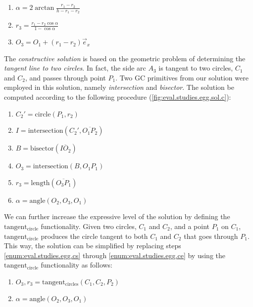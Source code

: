 \begin{enumerate}
  \item $\alpha = 2\arctan\frac{r_1 - r_2}{h - r_1 - r_2}$
  \item $r_3 = \frac{r_1 - r_2 \cos\alpha}{1 - \cos\alpha}$
  \item $O_3 = O_1 + \left(r_1 - r_2\right)\vec{e}_x$
\end{enumerate}

The \textit{constructive solution} is based on the geometric problem of
determining the \textit{tangent line to two circles}.  In fact, the side arc
$A_3$ is tangent to two circles, $C_1$ and $C_2$, and passes through point
$P_1$.  Two \ac{GC} primitives from our solution were employed in this
solution, namely \textit{intersection} and \textit{bisector}.  The solution be
computed according to the following procedure
(\cref{fig:eval.studies.egg.sol.c}):

\begin{enumerate}
  \item $C_{2}' = \mathrm{circle}\left(P_1, r_2\right)$
  \label{enum:eval.studies.egg.cs}
  \item $I = \mathrm{intersection}\left(C_{2}', \overline{O_1 P_2}\right)$
  \item $B = \mathrm{bisector}\left(\overline{IO_2}\right)$
  \item $O_3 = \mathrm{intersection}\left(B, O_1 P_1\right)$
  \item $r_3 = \mathrm{length}\left(\overline{O_3 P_1}\right)$
  \label{enum:eval.studies.egg.ce}
  \item $\alpha = \mathrm{angle}\left(O_2,O_3,O_1\right)$
\end{enumerate}

We can further increase the expressive level of the solution by defining the
$\mathrm{tangent_{circle}}$ functionality.  Given two circles, $C_1$ and $C_2$,
and a point $P_1$ on $C_1$, $\mathrm{tangent_{circle}}$ produces the circle
tangent to both $C_1$ and $C_2$ that goes through $P_1$.  This way, the solution
can be simplified by replacing steps \ref{enum:eval.studies.egg.cs} through
\ref{enum:eval.studies.egg.ce} by using the $\mathrm{tangent_{circle}}$
functionality as follows:

\begin{enumerate}
  \item $O_3,r_3 = \mathrm{tangent_{circles}}\left(C_1, C_2, P_2\right)$
  \item $\alpha = \mathrm{angle}\left(O_2, O_3, O_1\right)$
\end{enumerate}

